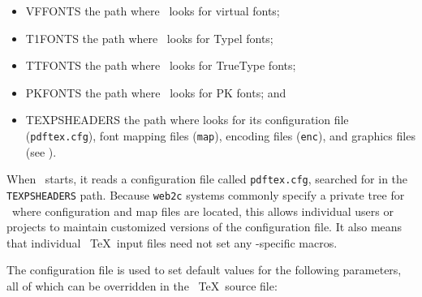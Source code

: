 \begin{itemize}
    \item VFFONTS the path where \pdfTEX\  looks for virtual fonts; 
    \item T1FONTS the path where \pdfTEX\  looks for Typel fonts; 
    \item TTFONTS the path where \pdfTEX\  looks for TrueType fonts; 
    \item PKFONTS the path where \pdfTEX\  looks for PK fonts; and 
    \item TEXPSHEADERS the path where \pdfTEX looks for its configuration file 
(\verb|pdftex.cfg|), font mapping files (\verb|map|), encoding files (\verb|enc|), and graphics 
files (see ). 
\end{itemize}


When \pdfTEX\  starts, it reads a configuration file called
\verb|pdftex.cfg|, searched for in the  \verb|TEXPSHEADERS| path.
Because \verb|web2c| systems commonly specify a private tree for
\pdfTEX\  where configuration and map files are located, this allows
individual users or projects to maintain customized versions of the
configuration file. It also means that individual \ \TeX\  input files
need not set any \pdfTEX-specific macros. 

The configuration file is used to set default values for the following parameters, 
all of which can be overridden in the \ \TeX\  source file: 

